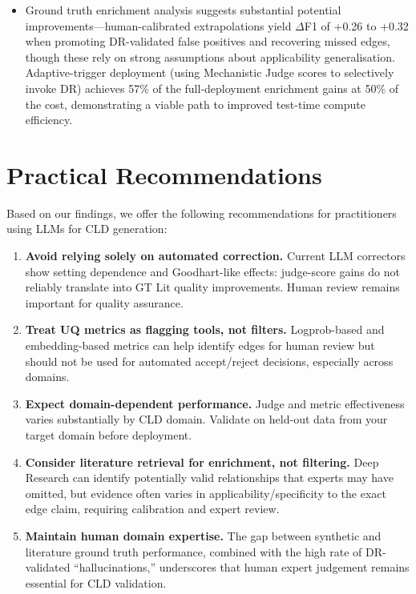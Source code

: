 \begin{itemize}[noitemsep]
    \item Ground truth enrichment analysis suggests substantial potential improvements---human-calibrated extrapolations yield $\Delta$F1 of +0.26 to +0.32 when promoting DR-validated false positives and recovering missed edges, though these rely on strong assumptions about applicability generalisation. Adaptive-trigger deployment (using Mechanistic Judge scores to selectively invoke DR) achieves 57\% of the full-deployment enrichment gains at 50\% of the cost, demonstrating a viable path to improved test-time compute efficiency.
\end{itemize}

\section{Practical Recommendations}
\label{sec:discussion_recommendations}

Based on our findings, we offer the following recommendations for practitioners using LLMs for CLD generation:

\begin{enumerate}
    \item \textbf{Avoid relying solely on automated correction.} Current LLM correctors show setting dependence and Goodhart-like effects: judge-score gains do not reliably translate into GT Lit quality improvements. Human review remains important for quality assurance.
    
    \item \textbf{Treat UQ metrics as flagging tools, not filters.} Logprob-based and embedding-based metrics can help identify edges for human review but should not be used for automated accept/reject decisions, especially across domains.
    
    \item \textbf{Expect domain-dependent performance.} Judge and metric effectiveness varies substantially by CLD domain. Validate on held-out data from your target domain before deployment.
    
    \item \textbf{Consider literature retrieval for enrichment, not filtering.} Deep Research can identify potentially valid relationships that experts may have omitted, but evidence often varies in applicability/specificity to the exact edge claim, requiring calibration and expert review.
    
    \item \textbf{Maintain human domain expertise.} The gap between synthetic and literature ground truth performance, combined with the high rate of DR-validated ``hallucinations,'' underscores that human expert judgement remains essential for CLD validation.
\end{enumerate}

